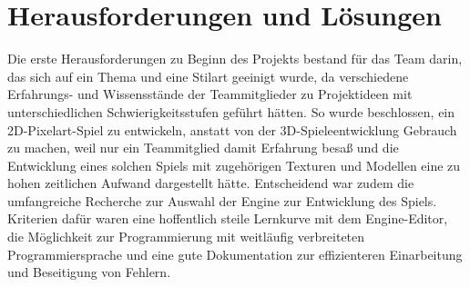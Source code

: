\chapter{Herausforderungen und Lösungen}\label{ch:herausforderungen}
Die erste Herausforderungen zu Beginn des Projekts bestand für das Team darin, das sich auf ein Thema und eine Stilart
geeinigt wurde, da verschiedene Erfahrungs- und Wissensstände der Teammitglieder zu Projektideen mit unterschiedlichen 
Schwierigkeitsstufen geführt hätten. 
So wurde beschlossen, ein 2D-Pixelart-Spiel zu entwickeln, anstatt von der 3D-Spieleentwicklung Gebrauch zu machen, weil 
nur ein Teammitglied damit Erfahrung besaß und die Entwicklung eines solchen Spiels mit zugehörigen Texturen und Modellen
eine zu hohen zeitlichen Aufwand dargestellt hätte. 
Entscheidend war zudem die umfangreiche Recherche zur Auswahl der Engine zur Entwicklung des Spiels. 
Kriterien dafür waren eine hoffentlich steile Lernkurve mit dem Engine-Editor, die Möglichkeit zur Programmierung mit 
weitläufig verbreiteten Programmiersprache und eine gute Dokumentation zur effizienteren Einarbeitung und Beseitigung
von Fehlern. 